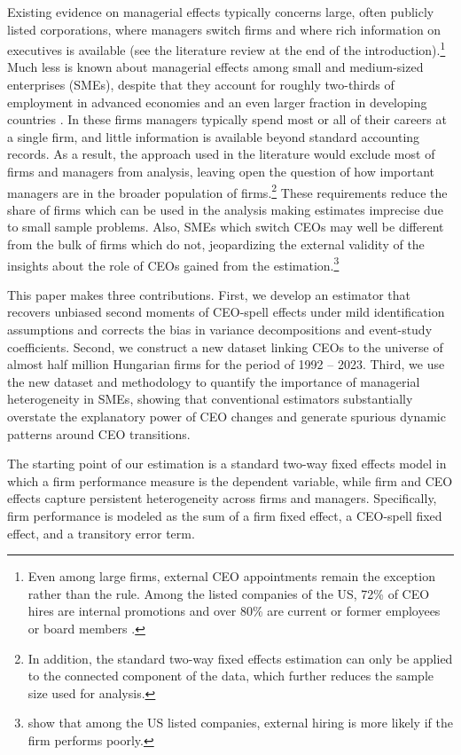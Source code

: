 \documentclass[11pt,a4paper]{article}
\begin{document}
Existing evidence on managerial effects typically concerns large, often publicly listed corporations, where managers switch firms and where rich information on executives is available (see the literature review at the end of the introduction).\footnote{Even among large firms, external CEO appointments remain the exception rather than the rule. Among the listed companies of the US, 72\% of CEO hires are internal promotions and over 80\% are current or former employees or board members \citep{cziraki2022market}.} Much less is known about managerial effects among small and medium-sized enterprises (SMEs), despite that they account for roughly two-thirds of employment in advanced economies and an even larger fraction in developing countries \citep{MadgavkarEtAl2024_MSMEs}. In these firms managers typically spend most or all of their careers at a single firm, and little information is available beyond standard accounting records. As a result, the approach used in the literature would exclude most of firms and managers from analysis, leaving open the question of how important managers are in the broader population of firms.\footnote{In addition, the standard two-way fixed effects estimation can only be applied to the connected component of the data, which further reduces the sample size used for analysis.} These requirements reduce the share of firms which can be used in the analysis making estimates imprecise due to small sample problems. Also, SMEs which switch CEOs may well be different from the bulk of firms which do not, jeopardizing the external validity of the insights about the role of CEOs gained from the estimation.\footnote{\cite{cziraki2022market} show that among the US listed companies, external hiring is more likely if the firm performs poorly.}

This paper makes three contributions. First, we develop an estimator that recovers unbiased second moments of CEO-spell effects under mild identification assumptions and corrects the bias in variance decompositions and event-study coefficients. Second, we construct a new dataset linking CEOs to the universe of almost half million Hungarian firms for the period of 1992 -- 2023. Third, we use the new dataset and methodology to quantify the importance of managerial heterogeneity in SMEs, showing that conventional estimators substantially overstate the explanatory power of CEO changes and generate spurious dynamic patterns around CEO transitions. 

The starting point of our estimation is a standard two-way fixed effects model in which a firm performance measure is the dependent variable, while firm and CEO effects capture persistent heterogeneity across firms and managers. Specifically, firm performance is modeled as the sum of a firm fixed effect, a CEO-spell fixed effect, and a transitory error term. 
\end{document}
